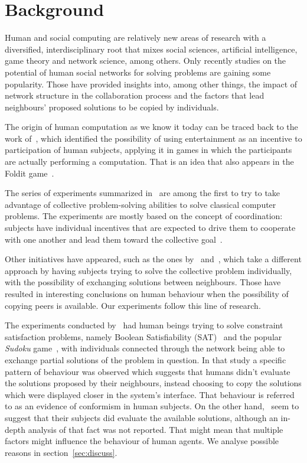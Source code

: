 \documentclass{article}
\begin{document}
\section{Background}

Human and social computing are relatively new areas of research with a diversified, interdisciplinary root that mixes social sciences, artificial intelligence, game theory and network science, among others. %
Only recently studies on the potential of human social networks for solving problems are gaining some popularity. %
Those have provided insights into, among other things, the impact of network structure in the collaboration process and the factors that lead neighbours' proposed solutions to be copied by individuals.

The origin of human computation as we know it today can be traced back to the work of~\cite{vonahm:gwap}, which identified the possibility of using entertainment as an incentive to participation of human subjects, applying it in games in which the participants are actually performing a computation. That is an idea that also appears in the Foldit game~\cite{cooper:foldit}.

The series of experiments summarized in~\cite{kearns:experim} are among the first to try to take advantage of collective problem-solving abilities to solve classical computer problems. The experiments are mostly based on the concept of coordination: subjects have individual incentives that are expected to drive them to cooperate with one another and lead them toward the collective goal~\cite{nowak:evolutioncooperation}.

Other initiatives have appeared, such as the ones by~\cite{farenzena:collabem} and~\cite{mason:collablearnet}, which take a different approach by having subjects trying to solve the collective problem individually, with the possibility of exchanging solutions between neighbours. Those have resulted in interesting conclusions on human behaviour when the possibility of copying peers is available. Our experiments follow this line of research.

The experiments conducted by~\cite{farenzena:collabem} had human beings trying to solve constraint satisfaction problems, namely Boolean Satisfiability (SAT)~\cite{cook:complexitytheoremproving} and the popular \emph{Sudoku} game~\cite{weber:satsudoku}, with individuals connected through the network being able to exchange partial solutions of the problem in question.
In that study a specific pattern of behaviour was observed which suggests that humans didn't evaluate the solutions proposed by their neighbours, instead choosing to copy the solutions which were displayed closer in the system's interface.
That behaviour is referred to as an evidence of conformism in human subjects. On the other hand,~\cite{mason:collablearnet} seem to suggest that their subjects did evaluate the available solutions, although %
an in-depth analysis of that fact was not reported. That might mean that multiple factors might influence the behaviour of human agents. We analyse possible reasons in section~\ref{sec:discuss}.
\end{document}
